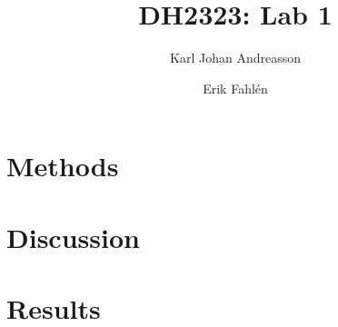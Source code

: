 \documentclass[a4paper]{article}
\begin{document}
\title{DH2323: Lab 1}
\author{Karl Johan Andreasson \and Erik Fahlén}

\maketitle
\clearpage

\section{Methods}

\section{Discussion}

\section{Results}
\end{document}
